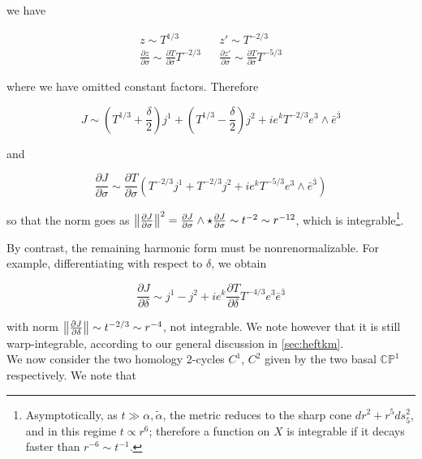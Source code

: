 we have


\begin{align}
	z \sim T^{1/3} && z' \sim T^{-2/3}\\	
	\frac{\partial z}{\partial \sigma} \sim \frac{\partial T}{\partial \sigma} T^{-2/3} && \frac{\partial z'}{\partial \sigma} \sim \frac{\partial T}{\partial \sigma} T^{-5/3}
\end{align}

where we have omitted constant factors. Therefore

\begin{equation}
	J \sim \left(T^{1/3} + \frac{\delta}{2}\right) j^1 + \left(T^{1/3} - \frac{\delta}{2}\right)j^2 + ie^k T^{-2/3} e^3 \wedge \bar e^{\bar 3}
	\label{}
\end{equation}

and

\begin{equation}
	\frac{\partial J}{\partial \sigma} \sim \frac{\partial T}{\partial \sigma}\left( T^{-2/3} j^1 + T^{-2/3} j^2 + i e^k T^{-5/3}e^3 \wedge \bar e^{\bar 3} \right)
	\label{}
\end{equation}


so that the norm goes as $\left\Vert \frac{\partial J}{\partial\sigma} \right\Vert^2 = \frac{\partial J}{\partial\sigma} \wedge \star \frac{\partial J}{\partial\sigma} \sim t^{-2} \sim r^{-12}$, which is integrable\footnote{Asymptotically, as $t\gg \alpha,\tilde{\alpha}$, the metric reduces to the sharp cone $dr^2 + r^5 ds_5^2$, and in this regime $t \propto r^6$; therefore a function on $X$ is integrable if it decays faster than $r^{-6} \sim t^{-1}$.}.

By contrast, the remaining harmonic form must be nonrenormalizable. For example, differentiating with respect to $\delta$, we obtain

\begin{equation}
	\frac{\partial J}{\partial \delta} \sim j^1 - j^2 + ie^k \frac{\partial T}{\partial \delta} T^{-4/3} e^3 \bar e^{\bar 3}
	\label{}
\end{equation}

with norm $ \left\Vert \frac{\partial J}{\partial\delta} \right\Vert \sim t^{-2/3} \sim r^{-4}$, not integrable. We note however that it is still warp-integrable, according to our general discussion in \ref{sec:heftkm}.\\

We now consider the two homology 2-cycles $C^1$, $C^2$ given by the two basal $\mathbb{CP}^1$ respectively. We note that

